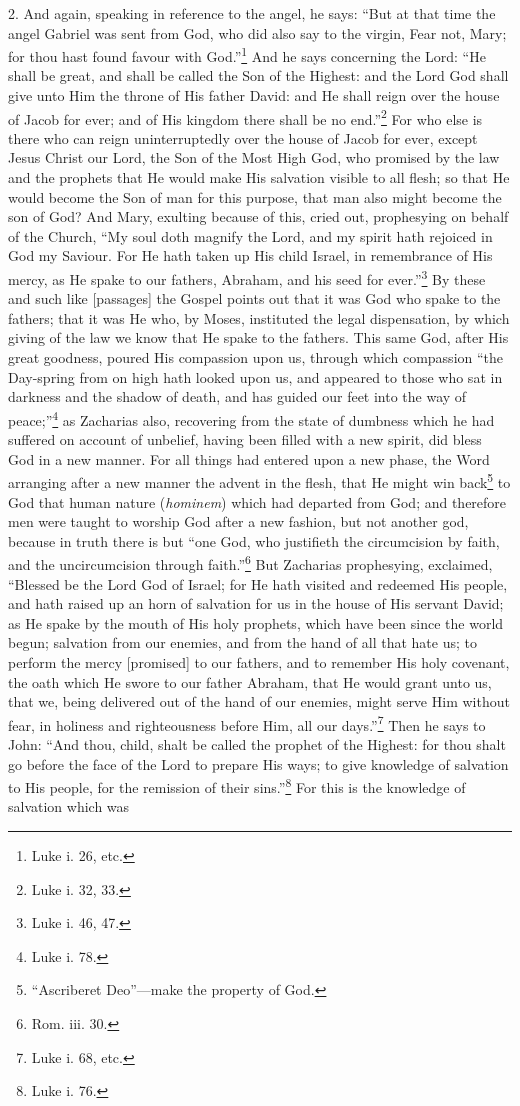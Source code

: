 2. And again, speaking in reference to the angel, he says: “But at that time the angel Gabriel was sent from God, who did also say to the virgin, Fear not, Mary; for thou hast found favour with God.”\footnote{Luke i. 26, etc.} And he says concerning the Lord: “He shall be great, and shall be called the Son of the Highest: and the Lord God shall give unto Him the throne of His father David: and He shall reign over the house of Jacob for ever; and of His kingdom there shall be no end.”\footnote{Luke i. 32, 33.} For who else is there who can reign uninterruptedly over the house of Jacob for ever, except Jesus Christ our Lord, the Son of the Most High God, who promised by the law and the prophets that He would make His salvation visible to all flesh; so that He would become the Son of man for this purpose, that man also might become the son of God? And Mary, exulting because of this, cried out, prophesying on behalf of the Church, “My soul doth magnify the Lord, and my spirit hath rejoiced in God my Saviour. For He hath taken up His child Israel, in remembrance of His mercy, as He spake to our fathers, Abraham, and his seed for ever.”\footnote{Luke i. 46, 47.} By these and such like [passages] the Gospel points out that it was God who spake to the fathers; that it was He who, by Moses, instituted the legal dispensation, by which giving of the law we know that He spake to the fathers. This same God, after His great goodness, poured His compassion upon us, through which compassion “the Day-spring from on high hath looked upon us, and appeared to those who sat in darkness and the shadow of death, and has guided our feet into the way of peace;”\footnote{Luke i. 78.} as Zacharias also, recovering from the state of dumbness which he had suffered on account of unbelief, having been filled with a new spirit, did bless God in a new manner. For all things had entered upon a new phase, the Word arranging after a new manner the advent in the flesh, that He might win back\footnote{“Ascriberet Deo”—make the property of God.} to God that human nature (\emph{hominem}) which had departed from God; and therefore men were taught to worship God after a new fashion, but not another god, because in truth there is but “one God, who justifieth the circumcision by faith, and the uncircumcision through faith.”\footnote{Rom. iii. 30.} But Zacharias prophesying, exclaimed, “Blessed be the Lord God of Israel; for He hath visited and redeemed His people, and hath raised up an horn of salvation for us in the house of His servant David; as He spake by the mouth of His holy prophets, which have been since the world begun; salvation from our enemies, and from the hand of all that hate us; to perform the mercy [promised] to our fathers, and to remember His holy covenant, the oath which He swore to our father Abraham, that He would grant unto us, that we, being delivered out of the hand of our enemies, might serve Him without fear, in holiness and righteousness before Him, all our days.”\footnote{Luke i. 68, etc.} Then he says to John: “And thou, child, shalt be called the prophet of the Highest: for thou shalt go before the face of the Lord to prepare His ways; to give knowledge of salvation to His people, for the remission of their sins.”\footnote{Luke i. 76.} For this is the knowledge of salvation which was 